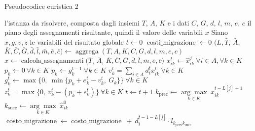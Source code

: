 \begin{algorithm}
    \caption{Pseudocodice euristica 2}
    \label{alg:euristica-semplificazione-istanza}
    \begin{algorithmic}[1]
        \Require l'istanza da risolvere, composta dagli insiemi $T$, $A$, $K$ e i dati $C$, $G$, $d$, $l$, $m$, $e$, $c$
        \Ensure il piano degli assegnamenti risultante, quindi il valore delle variabili $x$
        \State Siano $x, g, v, z$ le variabili del risultato globale
        \State $t \gets 0$
        \State $\operatorname{costi\_migrazione} \gets 0$
        \State $(L, \bar{T}$, $\bar{A}$, $\bar{K}, \bar{C}, \bar{G}, \bar{d}, \bar{l}, \bar{m}, \bar{e}, \bar{c}) \gets \operatorname{aggrega}(T, A, K, C, G, d, l, m, e, c)$
        \State $\hat{x} \gets \operatorname{calcola\_assegnamenti}(\bar{T}$, $\bar{A}$, $\bar{K}, \bar{C}, \bar{G}, \bar{d}, \bar{l}, \bar{m}, \bar{e}, \bar{c})$
                \State $x^t_{ik} \gets \hat{x}^j_{ik} ~ \forall i \in A, \forall k \in K$
                    \State $p_k \gets 0 ~ \forall k \in K$
                \Else
                    \State $p_k \gets g^{t-1}_k ~ \forall k \in K$
                \EndIf
                \State $v^t_k = \sum_{i \in A} d^t_i x^t_{ik} ~ \forall k \in K$
                \State $g^t_k \gets \max\{0, ~ \min\{p_k + e^t_k- v^t_k, ~ G_k\}\} ~ \forall k \in K$
                \State $z^t_k = \max\{0, ~ v^t_k - \left(p_k + e^t_k\right)\} ~ \forall k \in K$
                \State $t \gets t + 1$
            \EndFor
                \State $k_{\operatorname{prec}} \gets \underset{k \in K}{\arg\max} ~ x^{t-L[j]-1}_{ik}$
                \State $k_{\operatorname{succ}} \gets \underset{k \in K}{\arg\max} ~ \hat{x}^0_{ik}$
                    \State $\operatorname{costo\_migrazione} \gets \operatorname{costo\_migrazione} ~ + ~ d^{t-1-L[j]}_i \cdot l_{k_{\operatorname{prev}} k_{\operatorname{succ}}}$
                \EndIf
            \EndFor
            \EndIf
        \EndFor
    \end{algorithmic}
\end{algorithm}

